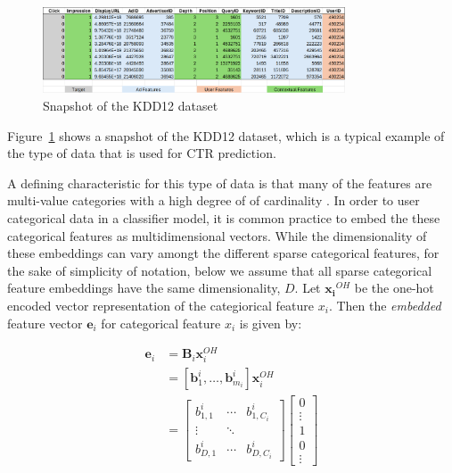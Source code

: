 \documentclass{mldsmsc}
\begin{document}
\begin{figure}[h]
\centering
\includegraphics[width=0.8\textwidth]{../figures/kdd12_snapshot.png}
\caption{Snapshot of the KDD12 dataset \cite{RefWorks:aden2012kdd}}
\label{fig:kdd12-snapshot}
\end{figure}

Figure~\ref{fig:kdd12-snapshot} shows a snapshot of the KDD12 dataset, which is a typical example of 
the type of data that is used for CTR prediction.

A defining characteristic for this type of data is that many of the features are multi-value categories with 
a high degree of of cardinality \citep{RefWorks:he2017neural}. In order to user categorical data
in a classifier model, it is common practice to embed the these categorical features
as multidimensional vectors. While the dimensionality of these embeddings can vary amongt the different
sparse categorical features, for the sake of simplicity of notation, below we assume that all sparse categorical feature
embeddings have the same dimensionality, $D$. Let $\mathbf{x_i}^{OH}$ be the one-hot encoded vector
representation of the categiorical feature $x_i$. Then the \emph{embedded} feature vector
$\mathbf{e}_i$ for categorical feature $x_i$ is given by:

\begin{equation}
\label{eqn:cat-embedding}
\begin{split}
\mathbf{e}_i &= \mathbf{B}_i \mathbf{x}_i^{OH}\\
&= \left[\mathbf{b}_{1}^{i}, \ldots, \mathbf{b}_{m_i}^{i} \right] \mathbf{x}_i^{OH} \\
&= \begin{bmatrix}
b_{1,1}^i & \cdots & b_{1 ,C_i}^i\\
\vdots & \ddots & \\
b_{D, 1}^i & \cdots & b_{D, C_i}^i
\end{bmatrix}
\begin{bmatrix}
    0 \\
    \vdots \\
    1 \\
    0\\
    \vdots
\end{bmatrix}
\end{split}
\end{equation}
\end{document}
